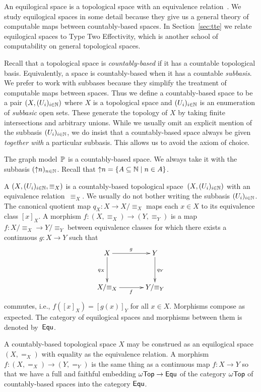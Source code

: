An equilogical space is a topological space with an
equivalence relation~. We study equilogical spaces
in some detail because they give us a general theory of computable
maps between countably-based spaces. In Section~\ref{sec:tte} we
relate equilogical spaces to Type Two Effectivity, which is another
school of computability on general topological spaces.

Recall that a topological space is \emph{countably-based} if it has a
countable topological basis. Equivalently, a space is countably-based
when it has a countable \emph{subbasis}. We prefer to work with
subbases because they simplify the treatment of computable maps
between spaces. Thus we define a countably-based space to be a pair
$(X, (U_i)_{i \in \mathbb{N}})$ where $X$ is a topological space and
$(U_i)_{i \in \mathbb{N}}$ is an enumeration of \emph{subbasic} open sets.
These generate the topology of $X$ by taking finite intersections and
arbitrary unions. While we usually omit an explicit mention of the
subbasis $(U_i)_{i \in \mathbb{N}}$, we do insist that a countably-based
space always be given \emph{together with} a particular subbasis. This
allows us to avoid the axiom of choice.

The graph model~$\mathbb{P}$ is a countably-based space. We always take it
with the subbasis $({\uparrow}n)_{n \in \mathbb{N}}$. Recall that ${\uparrow}n =
\{A \subseteq \mathbb{N} \mid n \in A\}$.

A  $(X, (U_i)_{i \in \mathbb{N}},
{\equiv_X})$ is a countably-based topological space~$(X, (U_i)_{i \in
  \mathbb{N}})$ with an equivalence relation~$\equiv_X$. We usually do not
bother writing the subbasis $(U_i)_{i \in \mathbb{N}}$. The canonical
quotient map $q_X : X \to X/{\equiv_X}$ maps each $x \in X$ to its
equivalence class $[x]_X$. A morphism $f : (X,{\equiv_X}) \to
(Y,{\equiv_Y})$ is a map $f : X/{\equiv_X} \to Y/{\equiv_Y}$ between
equivalence classes for which there exists a continuous $g : X \to Y$
such that
%
\begin{equation*}
  \xymatrix@+1em{
    {X} \ar[d]_{q_X} \ar[r]^g
    &
    {Y} \ar[d]^{q_Y}
    \\
    {X/{\equiv_X}}
    \ar[r]_f
    &
    {Y/{\equiv_Y}}
  }
\end{equation*}
%
commutes, i.e., $f([x]_X) = [g(x)]_Y$ for all $x \in X$. Morphisms
compose as expected. The category of equilogical spaces and morphisms
between them is denoted by~$\mathsf{Equ}$.

A countably-based topological space $X$ may be construed as an
equilogical space $(X, {=_X})$ with equality as the equivalence
relation. A morphism $f : (X, {=_X}) \to (Y, {=_Y})$ is the same
thing as a continuous map $f : X \to Y$ so that we have a full and
faithful embedding $\mathsf{\omega Top} \to \mathsf{Equ}$ of the category $\mathsf{\omega Top}$ of
countably-based spaces into the category $\mathsf{Equ}$.

